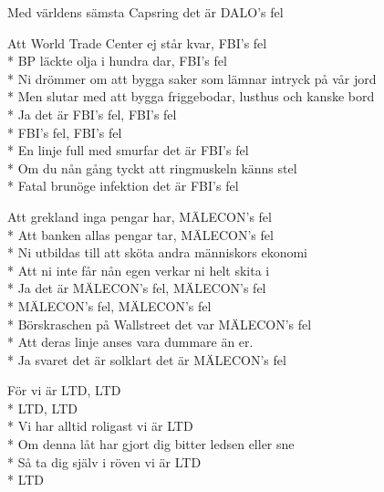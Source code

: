\begin{SongText}
\begin{Verse}
    Med världens sämsta Capsring det är DALO's fel
\end{Verse}
\begin{Verse}
    Att World Trade Center ej står kvar, FBI's fel\\*%
    BP läckte olja i hundra dar, FBI's fel\\*%
    Ni drömmer om att bygga saker som lämnar intryck på vår jord\\*%
    Men slutar med att bygga friggebodar, lusthus och kanske bord\\*%
    Ja det är FBI's fel, FBI's fel\\*%
    FBI's fel, FBI's fel\\*%
    En linje full med smurfar det är FBI's fel\\*%
    Om du nån gång tyckt att ringmuskeln känns stel\\*%
    Fatal brunöge infektion det är FBI's fel
\end{Verse}
\begin{Verse}
    Att grekland inga pengar har, MÄLECON's fel\\*%
    Att banken allas pengar tar, MÄLECON's fel\\*%
    Ni utbildas till att sköta andra människors ekonomi\\*%
    Att ni inte får nån egen verkar ni helt skita i\\*%
    Ja det är MÄLECON's fel, MÄLECON's fel\\*%
    MÄLECON's fel, MÄLECON's fel\\*%
    Börskraschen på Wallstreet det var MÄLECON's fel\\*%
    Att deras linje anses vara dummare än er.\\*%
    Ja svaret det är solklart det är MÄLECON's fel
\end{Verse}
\begin{Verse}
    För vi är LTD, LTD\\*%
    LTD, LTD\\*%
    Vi har alltid roligast vi är LTD\\*%
    Om denna låt har gjort dig bitter ledsen eller sne\\*%
    Så ta dig själv i röven vi är LTD\\*%
    LTD
\end{Verse}
\end{SongText}

